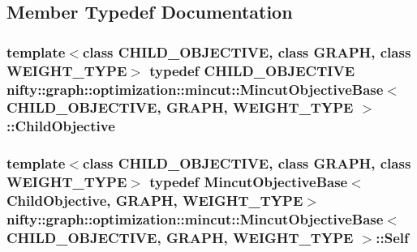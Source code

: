\subsection{Member Typedef Documentation}
\hypertarget{classnifty_1_1graph_1_1optimization_1_1mincut_1_1MincutObjectiveBase_a6943abac42bd9b021bb69094dc3c42c1}{}
\subsubsection[{Child\+Objective}]{\setlength{\rightskip}{0pt plus 5cm}template$<$class C\+H\+I\+L\+D\+\_\+\+O\+B\+J\+E\+C\+T\+I\+V\+E, class G\+R\+A\+P\+H, class W\+E\+I\+G\+H\+T\+\_\+\+T\+Y\+P\+E$>$ typedef C\+H\+I\+L\+D\+\_\+\+O\+B\+J\+E\+C\+T\+I\+V\+E {\bf nifty\+::graph\+::optimization\+::mincut\+::\+Mincut\+Objective\+Base}$<$ C\+H\+I\+L\+D\+\_\+\+O\+B\+J\+E\+C\+T\+I\+V\+E, G\+R\+A\+P\+H, W\+E\+I\+G\+H\+T\+\_\+\+T\+Y\+P\+E $>$\+::{\bf Child\+Objective}}\label{classnifty_1_1graph_1_1optimization_1_1mincut_1_1MincutObjectiveBase_a6943abac42bd9b021bb69094dc3c42c1}
\hypertarget{classnifty_1_1graph_1_1optimization_1_1mincut_1_1MincutObjectiveBase_a6711b53c0f9ff2db5f3e0ab9e35a11ac}{}
\subsubsection[{Self}]{\setlength{\rightskip}{0pt plus 5cm}template$<$class C\+H\+I\+L\+D\+\_\+\+O\+B\+J\+E\+C\+T\+I\+V\+E, class G\+R\+A\+P\+H, class W\+E\+I\+G\+H\+T\+\_\+\+T\+Y\+P\+E$>$ typedef {\bf Mincut\+Objective\+Base}$<${\bf Child\+Objective}, G\+R\+A\+P\+H, W\+E\+I\+G\+H\+T\+\_\+\+T\+Y\+P\+E$>$ {\bf nifty\+::graph\+::optimization\+::mincut\+::\+Mincut\+Objective\+Base}$<$ C\+H\+I\+L\+D\+\_\+\+O\+B\+J\+E\+C\+T\+I\+V\+E, G\+R\+A\+P\+H, W\+E\+I\+G\+H\+T\+\_\+\+T\+Y\+P\+E $>$\+::{\bf Self}}\label{classnifty_1_1graph_1_1optimization_1_1mincut_1_1MincutObjectiveBase_a6711b53c0f9ff2db5f3e0ab9e35a11ac}



